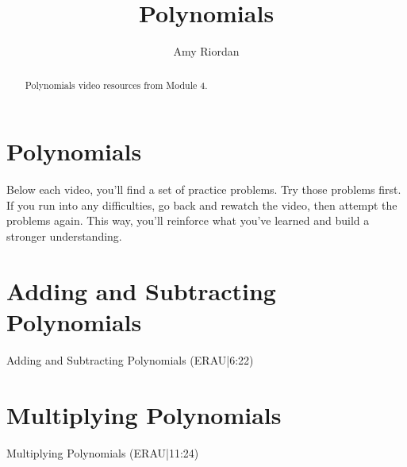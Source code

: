 \documentclass{ximera}
\title{Polynomials}
\author{Amy Riordan}
\begin{document}
\begin{abstract}
Polynomials video resources from Module 4.
\end{abstract}
\maketitle

\section*{Polynomials}

Below each video, you’ll find a set of practice problems. Try those problems first. If you run into any difficulties, go back and rewatch the video, then attempt the problems again. This way, you’ll reinforce what you’ve learned and build a stronger understanding.

\section*{Adding and Subtracting Polynomials}

Adding and Subtracting Polynomials (ERAU|6:22)




\section*{Multiplying Polynomials}

Multiplying Polynomials (ERAU|11:24)

\end{document}

